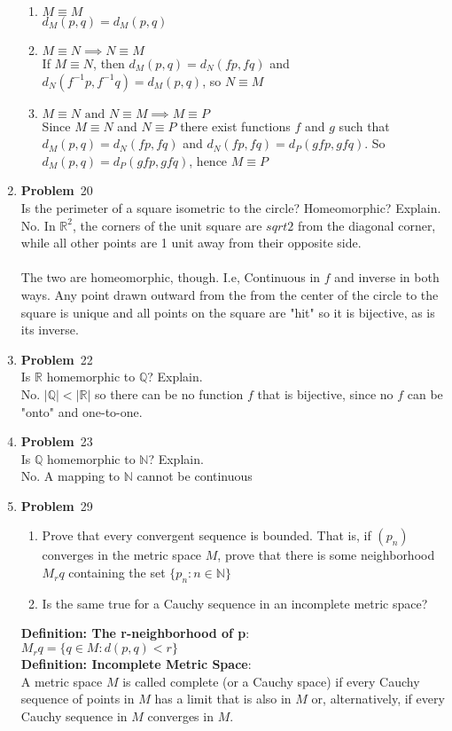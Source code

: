 \documentclass[12pt]{amsart}
\newcommand{\benu}{\begin{enumerate}}
\newcommand{\eenu}{\end{enumerate}}
\theoremstyle{definition}
\newcommand{\mbR}{\mathbb{R}}
\newcommand{\mbN}{\mathbb{N}}
\newcommand{\mbQ}{\mathbb{Q}}
\newcommand{\itep}{\item {\bfseries Problem}\ }
\begin{document}
\begin{enumerate}[series=p]
\benu
\item $M \equiv M$\\
$d_M(p,q) = d_M(p,q)$
\item $M \equiv N \implies N \equiv M$\\
If $M \equiv N$, then $d_M(p,q) = d_N(fp, fq)$ and $d_N(f^{-1}p, f^{-1}q) = d_M(p,q)$, so $N \equiv M$
\item $M \equiv N \text{ and }  N \equiv M \implies M \equiv P$\\
Since $M \equiv N$ and $N \equiv P$ there exist functions $f$ and $g$ such that $d_M(p,q) = d_N(fp, fq)$ and $d_N(fp, fq) = d_P(gfp, gfq)$.  So $d_M(p,q) =  d_P(gfp, gfq)$, hence $M \equiv P$
\eenu
\newpage

\itep 20\\
Is the perimeter of a square isometric to the circle?  Homeomorphic?  Explain.\\
No.  In $\mbR^2$, the corners of the unit square are $sqrt{2}$ from the diagonal corner, while all other points are 1 unit away from their opposite side.\\
\\
The two are homeomorphic, though.  I.e, Continuous in $f$ and inverse in both ways.  Any point drawn outward from the from the center of the circle to the square is unique and all points on the square are "hit" so it is bijective, as is its inverse.
\newpage

\itep 22\\
Is $\mbR$ homemorphic to $\mbQ$?  Explain.\\
No.  $|\mbQ| < |\mbR|$ so there can be no function $f$ that is bijective, since no $f$ can be "onto" and one-to-one.
\newpage

\itep 23\\
Is $\mbQ$ homemorphic to $\mbN$?  Explain.\\
No.  A mapping to $\mbN$ cannot be continuous
\newpage

\itep 29\\
\benu
\item Prove that every convergent sequence is bounded.  That is, if $(p_n)$ converges in the metric space $M$, prove that there is some neighborhood $M_rq$ containing the set $\{p_n:n\in \mbN\}$
\item Is the same true for a Cauchy sequence in an incomplete metric space?
\eenu
\textbf{Definition: The r-neighborhood of p}:\\
$M_rq = \{q \in M: d(p,q) < r\}$
\\
\textbf{Definition: Incomplete Metric Space}:\\
A metric space $M$ is called complete (or a Cauchy space) if every Cauchy sequence of points in $M$ has a limit that is also in $M$ or, alternatively, if every Cauchy sequence in $M$ converges in $M$.
\newpage



\end{enumerate}
\end{document}
